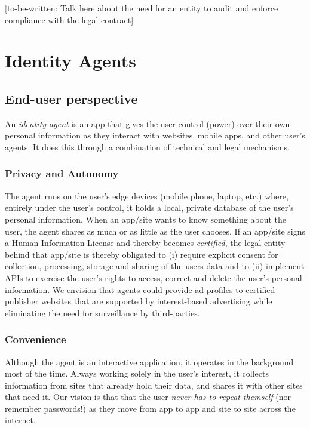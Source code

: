 \documentclass[11pt, oneside]{article}   	%
\begin{document}
[to-be-written: Talk here about the need for an entity to audit and enforce compliance with the legal contract]

\section{Identity Agents} 

\subsection{End-user perspective}
An \emph{identity agent} is an app that gives the user control (power) over their own personal information as they interact with websites, mobile apps, and other user's agents. It does this through a combination of technical and legal mechanisms.

\subsubsection{Privacy and Autonomy} 
The agent runs on the user's edge devices (mobile phone, laptop, etc.) where, entirely under the user's control, it holds a local, private database of the user's personal information. When an app/site wants to know something about the user, the agent shares as much or as little as the user chooses. If an app/site signs a Human Information License and thereby becomes \emph{certified}, the legal entity behind that app/site is thereby obligated to (i) require explicit consent for collection, processing, storage and sharing of the users data and to (ii) implement APIs to exercise the user's rights to access, correct and delete the user's personal information. We envision that agents could provide ad profiles to certified publisher websites that are supported by interest-based advertising while eliminating the need for surveillance by third-parties.

\subsubsection{Convenience}
Although the agent is an interactive application, it operates in the background most of the time. Always working solely in the user's interest, it collects information from sites that already hold their data, and shares it with other sites that need it. Our vision is that that the user \emph{never has to repeat themself} (nor remember passwords!) as they move from app to app and site to site across the internet.
\end{document}
